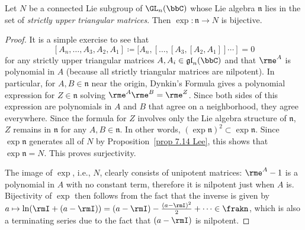 \begin{cor}\label{cor 5.16 Sepanski}
    Let $N$ be a connected Lie subgroup of $\GL_n(\bbC)$ whose Lie algebra $\mathfrak{n}$ lies in the set of \emph{strictly upper triangular matrices}. Then $\exp:\mathfrak{n}\to N$ is bijective. 
\end{cor}
\begin{proof}
    It is a simple exercise to see that 
    \[[A_n,\ldots,A_3,A_2,A_1]\coloneqq [A_n,[\ldots,[A_3,[A_2,A_1]]\cdots ]=0\] 
    for any strictly upper triangular matrices $A,A_i\in \mathfrak{gl}_n(\bbC)$ and that $\rme^A$ is polynomial in $A$ (because all strictly triangular matrices are nilpotent). In particular, for $A,B\in\mathfrak{n}$ near the origin, Dynkin's Formula gives a polynomial expression for $Z\in\mathfrak{n}$ solving $\rme^A\rme^B=\rme^Z$. Since both sides of this expression are polynomials in $A$ and $B$ that agree on a neighborhood, they agree everywhere. Since the formula for $Z$ involves only the Lie algebra structure of $\mathfrak{n}$, $Z$ remains in $\mathfrak{n}$ for any $A,B\in\mathfrak{n}$. In other words, $(\exp\mathfrak{n})^2\subset \exp\mathfrak{n}$. Since $\exp\mathfrak{n}$ generates all of $N$ by Proposition~\ref{prop 7.14 Lee}, this shows that $\exp\mathfrak{n}=N$. This proves surjectivity.

    The image of $\exp$, i.e., $N$, clearly consists of unipotent matrices: $\rme^A-1$ is a polynomial in $A$ with no constant term, therefore it is nilpotent just when $A$ is. Bijectivity of $\exp$ then follows from the fact that the inverse is given by $a\mapsto \ln (\rmI+(a-\rmI))=(a-\rmI)-\frac{(a-\rmI)^2}{2}+\cdots\in\frakn$, which is also a terminating series due to the fact that $(a-\rmI)$ is nilpotent.
\end{proof}

